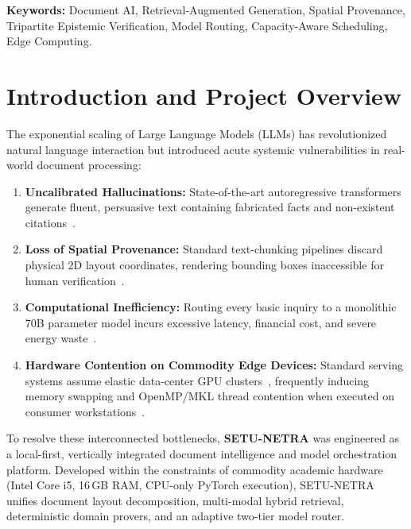 \documentclass[11pt,a4paper]{article}
\begin{document}
\begin{titlepage}
    \vfill
    {\small \textbf{Keywords:} Document AI, Retrieval-Augmented Generation, Spatial Provenance, Tripartite Epistemic Verification, Model Routing, Capacity-Aware Scheduling, Edge Computing.}
    \vspace*{1.0cm}
\end{titlepage}

\newpage
\tableofcontents
\newpage

\section{Introduction and Project Overview}
\label{sec:intro}

The exponential scaling of Large Language Models (LLMs) has revolutionized natural language interaction but introduced acute systemic vulnerabilities in real-world document processing:
\begin{enumerate}[label=(\roman*)]
    \item \textbf{Uncalibrated Hallucinations:} State-of-the-art autoregressive transformers generate fluent, persuasive text containing fabricated facts and non-existent citations~\cite{Gao2023ALCE,Menick2022GopherCite}.
    \item \textbf{Loss of Spatial Provenance:} Standard text-chunking pipelines discard physical 2D layout coordinates, rendering bounding boxes inaccessible for human verification~\cite{Xu2020LayoutLM}.
    \item \textbf{Computational Inefficiency:} Routing every basic inquiry to a monolithic 70B parameter model incurs excessive latency, financial cost, and severe energy waste~\cite{Chen2023FrugalGPT}.
    \item \textbf{Hardware Contention on Commodity Edge Devices:} Standard serving systems assume elastic data-center GPU clusters~\cite{Kwon2023vLLM,Zhong2024DistServe}, frequently inducing memory swapping and OpenMP/MKL thread contention when executed on consumer workstations~\cite{Gujarati2020Clockwork}.
\end{enumerate}

To resolve these interconnected bottlenecks, \textbf{SETU-NETRA} was engineered as a local-first, vertically integrated document intelligence and model orchestration platform. Developed within the constraints of commodity academic hardware (Intel Core i5, 16\,GB RAM, CPU-only PyTorch execution), SETU-NETRA unifies document layout decomposition, multi-modal hybrid retrieval, deterministic domain provers, and an adaptive two-tier model router.
\end{document}
